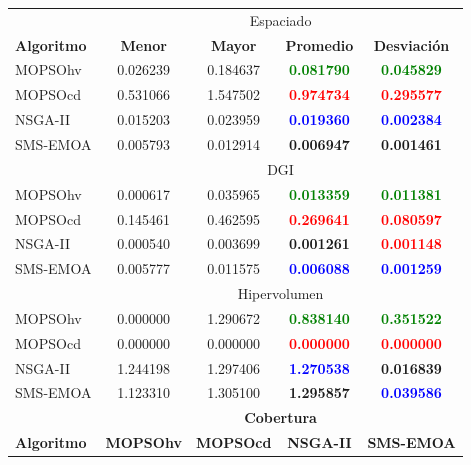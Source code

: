 \begin{table}
 \begin{center}
  \begin{tabular}{|l|cc|cc|} \hline
    & \multicolumn{4}{|c|}{Espaciado} \\ 
	\textbf{Algoritmo} & \textbf{Menor} & \textbf{Mayor} & \textbf{Promedio} & \textbf{Desviaci\'on} \\  \hline \hline
	MOPSOhv &0.026239 & 0.184637 &  \textbf{\textcolor{green}{0.081790}} &  \textbf{\textcolor{green}{0.045829}}    \\ 
	MOPSOcd &0.531066 & 1.547502 &  \textbf{\textcolor{red}{0.974734}} &  \textbf{\textcolor{red}{0.295577}}   \\ 
	NSGA-II &0.015203 & 0.023959 &  \textbf{\textcolor{blue}{0.019360}} & \textbf{\textcolor{blue}{ 0.002384  }} \\  
	SMS-EMOA&0.005793 & 0.012914 & \textbf{0.006947} &  \textbf{0.001461}   \\  
	\hline\hline
    & \multicolumn{4}{|c|}{DGI} \\ \hline\hline
	MOPSOhv &0.000617 & 0.035965 &  \textbf{\textcolor{green}{0.013359}} &  \textbf{\textcolor{green}{0.011381}}  \\ 
	MOPSOcd &0.145461 & 0.462595 &  \textbf{\textcolor{red}{0.269641}} &  \textbf{\textcolor{red}{0.080597}}  \\ 
	NSGA-II &0.000540 & 0.003699 & \textbf{0.001261} &  \textbf{\textcolor{red}{0.001148}}   \\  
	SMS-EMOA &0.005777 & 0.011575 &  \textbf{\textcolor{blue}{0.006088}} &  \textbf{\textcolor{blue}{0.001259}}  \\  
	\hline\hline
    & \multicolumn{4}{|c|}{Hipervolumen} \\ 
  \hline\hline
	MOPSOhv &0.000000 & 1.290672 &  \textbf{\textcolor{green}{0.838140}} & \textbf{\textcolor{green}{0.351522}}  \\ 
	MOPSOcd &0.000000 & 0.000000 &  \textbf{\textcolor{red}{0.000000}} &  \textbf{\textcolor{red}{0.000000}}  \\ 
	NSGA-II &1.244198 & 1.297406 &  \textbf{\textcolor{blue}{1.270538}} &  \textbf{0.016839}  \\  
	SMS-EMOA &1.123310 & 1.305100 &\textbf{ 1.295857} &  \textbf{\textcolor{blue}{0.039586}}  \\  
	\hline\hline
	& \multicolumn{4}{|c|}{\textbf{Cobertura}} \\ \hline\hline 
	\textbf{Algoritmo} & \textbf{MOPSOhv} & \textbf{MOPSOcd} & \textbf{NSGA-II} & \textbf{SMS-EMOA} \\  \hline \hline

\end{tabular}
\end{center}
\end{table}
